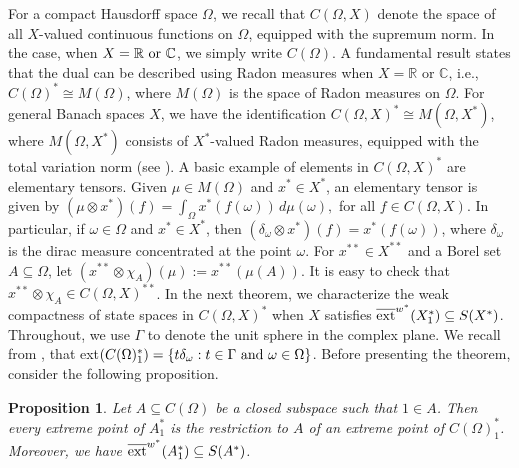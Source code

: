 \documentclass[12pt]{amsart}
\newtheorem{proposition}[theorem]{Proposition}
\theoremstyle{definition}
\numberwithin{equation}{section}
\begin{document}
For a compact Hausdorff space $\Omega$, we recall that $C(\Omega,X)$ denote the space of all $X$-valued continuous functions on $\Omega$, equipped with the supremum norm. In the case, when $X=\mathbb{R \textnormal{ or }C}$, we simply write $C(\Omega)$. A fundamental result states that the dual can be described using Radon measures when \( X = \mathbb{R}\text{ or }\mathbb{C} \), i.e., $C(\Omega)^* \cong M(\Omega)$,
where \( M(\Omega) \) is the space of Radon measures on \( \Omega \). For general Banach spaces \( X \),  we have the identification $C(\Omega, X)^* \cong M(\Omega, X^*)$,
where \( M(\Omega, X^*) \) consists of \( X^* \)-valued Radon measures, equipped with the total variation  norm (see \cite[Theorem~1.7.1]{CP}).
A basic example of elements in \( C(\Omega, X)^* \) are elementary tensors. Given \( \mu \in M(\Omega) \) and \(x^* \in X^*\), an elementary tensor is given by
$
{(\mu\otimes x^*)}(f) = \int_\Omega x^*(f(\omega)) \, d\mu(\omega),
$
for all \( f \in C(\Omega, X) \). In particular, if $\omega\in\Omega$ and $x^*\in X^*$, then $(\delta_{\omega}\otimes x^*)(f)=x^*(f(\omega))$, where $\delta_{\omega}$ is the dirac measure concentrated at the point $\omega$. For $x^{**}\in X^{**}$ and a Borel set $A\subseteq \Omega$, let $(x^{**}\otimes\chi_{A})(\mu):=x^{**}(\mu(A))$. It is easy to check that $x^{**}\otimes\chi_{A}\in C(\Omega,X)^{**}$. In the next theorem, we characterize the weak compactness of state spaces in $C(\Omega, X)^*$ when $X$ satisfies $\overline{\textnormal{ext}}^{w^*}{(X_{1}^*)}\subseteq S(X^*)$. Throughout, we use $\Gamma$ to denote the unit sphere in the complex plane. We recall from \cite[Theorem~8.4]{C}, that ext$(C(\Omega)_{1}^*)=\{t\delta_{\omega}:t\in \Gamma \textnormal{ and }\omega\in \Omega\}$. Before presenting the theorem, consider the following proposition.
\begin{proposition}\label{P38}
   Let $A\subseteq C(\Omega)$ be a closed subspace such that $1\in A$. Then every extreme point of $A_{1}^*$ is the restriction to $A$ of an extreme point of $C(\Omega)_{1}^*$. Moreover, we have $\overline{\textnormal{ext}}^{w^*}{(A_{1}^*)}\subseteq S(A^*)$.
\end{proposition}
\end{document}
